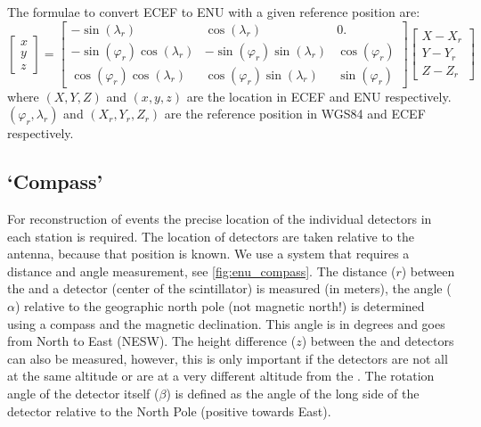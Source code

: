 The formulae to convert ECEF to ENU with a given reference position are:
%
\begin{equation}
    \begin{bmatrix}
        x \\
        y \\
        z
    \end{bmatrix}
    =
    \begin{bmatrix}
                        -\sin(\lambda_r) &                  \cos(\lambda_r) &              0. \\
        -\sin(\varphi_r) \cos(\lambda_r) & -\sin(\varphi_r) \sin(\lambda_r) & \cos(\varphi_r) \\
         \cos(\varphi_r) \cos(\lambda_r) &  \cos(\varphi_r) \sin(\lambda_r) & \sin(\varphi_r)
    \end{bmatrix}
    \begin{bmatrix}
        X - X_r \\
        Y - Y_r \\
        Z - Z_r
    \end{bmatrix}
\end{equation}
%
where $(X, Y, Z)$ and $(x, y, z)$ are the location in ECEF and
ENU respectively. $(\varphi_r, \lambda_r)$ and $(X_r, Y_r, Z_r)$ are the
reference position in WGS84 and ECEF respectively.


\subsection{`Compass'}

For reconstruction of events the precise location of the individual
detectors in each station is required. The location of detectors are
taken relative to the \gps antenna, because that position is known. We
use a system that requires a distance and angle measurement, see
\cref{fig:enu_compass}. The distance ($r$) between the \gps and a
detector (center of the scintillator) is measured (in meters), the angle
($\alpha$) relative to the geographic north pole (not magnetic north!)
is determined using a compass and the magnetic declination. This angle
is in degrees and goes from North to East (NESW). The height difference
($z$) between the \gps and detectors can also be measured, however, this
is only important if the detectors are not all at the same altitude or
are at a very different altitude from the \gps. The rotation angle of
the detector itself ($\beta$) is defined as the angle of the long side
of the detector relative to the North Pole (positive towards East).

